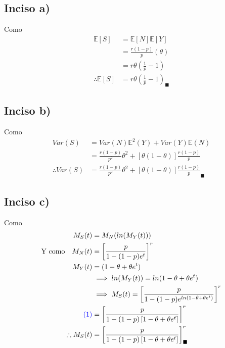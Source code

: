 \documentclass[
]{article}
\begin{document}
\hypertarget{inciso-a-1}{%
\subsection{Inciso a)}\label{inciso-a-1}}

Como \begin{align*}
\mathbb{E}[S] &= \mathbb{E}[N] \mathbb{E}[Y]\\
              &= \frac{r (1 - p)}{p}(\theta)\\
              &= r\theta \left(\frac{1}{p} - 1\right)\\
\therefore \mathbb{E}[S] &= r\theta \left(\frac{1}{p} - 1\right)_\blacksquare
\end{align*}

\hypertarget{inciso-b-1}{%
\subsection{Inciso b)}\label{inciso-b-1}}

Como \begin{align*}
Var(S) &= Var(N) \mathbb{E}^{2}(Y) + Var(Y) \mathbb{E}(N)\\
       &= \frac{r(1 - p)}{p^{2}}\theta^{2} + [\theta(1 - \theta)] \frac{r (1 - p)}{p}\\
\therefore Var(S) &= \frac{r(1 - p)}{p^{2}}\theta^{2} + [\theta(1 - \theta)] \frac{r (1 - p)}{p}_\blacksquare
\end{align*}

\hypertarget{inciso-c-1}{%
\subsection{Inciso c)}\label{inciso-c-1}}

Como \begin{align*}
M_{S}(t) &= M_{N} (ln(M_{Y}(t)))\\
\text{Y como} \quad M_{N}(t) &= \left[\frac{p}{1 - (1 - p)e^{t}}\right]^{r}\\
              M_{Y}(t) &= (1 - \theta + \theta e^{t})\\
              &\implies ln(M_{Y}(t)) = ln(1 - \theta + \theta e^{t})\\
              &\implies M_{S}(t) = \left[\frac{p}{1 - (1 - p) e^{ln(1 - \theta + \theta e^{t})}}\right]^{r}\\
\textcolor{blue}{(1)} &= \left[\frac{p}{1 - (1 - p) \left[1 - \theta + \theta e^{t}\right]}\right]^{r}\\
\therefore M_{S}(t) &= \left[\frac{p}{1 - (1 - p) \left[1 - \theta + \theta e^{t}\right]}\right]^{r}_\blacksquare
\end{align*}
\end{document}
